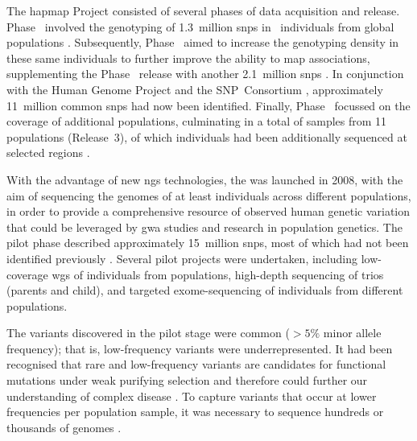 The \gls{hapmap} Project consisted of several phases of data acquisition and release.
Phase~ involved the genotyping of 1.3~million \glspl{snp} in ~individuals from  global populations \citep{Thorisson:2005ff}.
Subsequently, Phase~ aimed to increase the genotyping density in these same individuals to further improve the ability to map associations, supplementing the Phase~ release with another 2.1~million \glspl{snp} \citep{Frazer:2007kha}.
In conjunction with the Human Genome Project and the SNP~Consortium \citep{McCarroll:2008dy}, approximately 11~million common \glspl{snp} had now been identified.
Finally, Phase~ focussed on the coverage of additional populations, culminating in a total of  samples from 11 populations (Release~3), of which  individuals had been additionally sequenced at selected regions \citep{InternationalHapMapConsortium:2010en}.

With the advantage of new \gls{ngs} technologies, the  was launched in 2008, with the aim of sequencing the genomes of at least  individuals across different populations, in order to provide a comprehensive resource of observed human genetic variation that could be leveraged by \gls{gwa} studies and research in population genetics.
The pilot phase described approximately 15~million \glspl{snp}, most of which had not been identified previously \citep{Durbin:2010gj}.
Several pilot projects were undertaken, including low-coverage \gls{wgs} of  individuals from  populations, high-depth sequencing of  trios (parents and child), and targeted exome-sequencing of  individuals from  different populations.

The variants discovered in the pilot stage were common ($>5\%$ minor allele frequency); that is, low-frequency variants were underrepresented.
It had been recognised that rare and low-frequency variants are candidates for functional mutations under weak purifying selection and therefore could further our understanding of complex disease \citep{Marth:2011bz,Tennessen:2012ck}.
To capture variants that occur at lower frequencies per population sample, it was necessary to sequence hundreds or thousands of genomes \citep{Kaiser:2008wd}.

%

%

